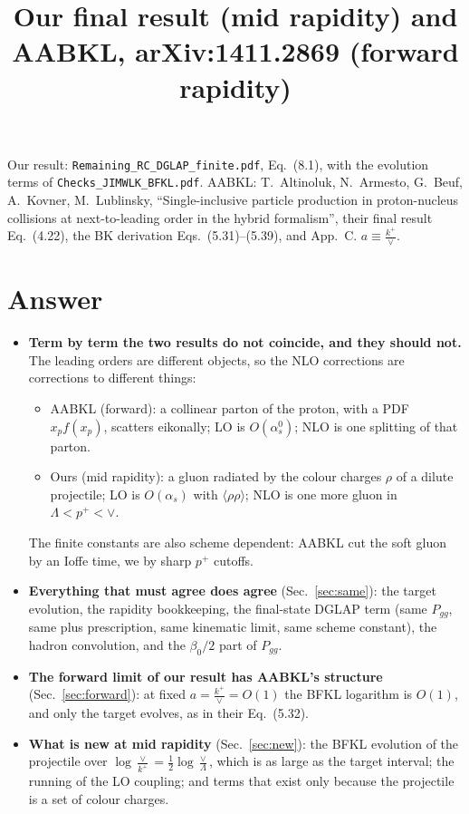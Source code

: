 \documentclass[10pt]{article}
\title{Our final result (mid rapidity) and AABKL, arXiv:1411.2869 (forward rapidity)}
\date{}
\numberwithin{equation}{section}
\begin{document}
\maketitle
\noindent Our result: \texttt{Remaining\_RC\_DGLAP\_finite.pdf}, Eq.~(8.1), with the evolution terms of \texttt{Checks\_JIMWLK\_BFKL.pdf}. AABKL: T.~Altinoluk, N.~Armesto, G.~Beuf, A.~Kovner, M.~Lublinsky, ``Single-inclusive particle production in proton-nucleus collisions at next-to-leading order in the hybrid formalism'', their final result Eq.~(4.22), the BK derivation Eqs.~(5.31)--(5.39), and App.~C. $a\equiv\frac{k^+}{\vee}$.

\section{Answer}
\begin{itemize}
\item \textbf{Term by term the two results do not coincide, and they should not.} The leading orders are different objects, so the NLO corrections are corrections to different things:
\begin{itemize}
\item AABKL (forward): a collinear parton of the proton, with a PDF $x_pf(x_p)$, scatters eikonally; LO is $O(\alpha_s^0)$; NLO is one splitting of that parton.
\item Ours (mid rapidity): a gluon radiated by the colour charges $\rho$ of a dilute projectile; LO is $O(\alpha_s)$ with $\langle\rho\rho\rangle$; NLO is one more gluon in $\Lambda<p^+<\vee$.
\end{itemize}
The finite constants are also scheme dependent: AABKL cut the soft gluon by an Ioffe time, we by sharp $p^+$ cutoffs.
\item \textbf{Everything that must agree does agree} (Sec.~\ref{sec:same}): the target evolution, the rapidity bookkeeping, the final-state DGLAP term (same $P_{gg}$, same plus prescription, same kinematic limit, same scheme constant), the hadron convolution, and the $\beta_0/2$ part of $P_{gg}$.
\item \textbf{The forward limit of our result has AABKL's structure} (Sec.~\ref{sec:forward}): at fixed $a=\frac{k^+}{\vee}=O(1)$ the BFKL logarithm is $O(1)$, and only the target evolves, as in their Eq.~(5.32).
\item \textbf{What is new at mid rapidity} (Sec.~\ref{sec:new}): the BFKL evolution of the projectile over $\log\frac{\vee}{k^+}=\frac12\log\frac{\vee}{\Lambda}$, which is as large as the target interval; the running of the LO coupling; and terms that exist only because the projectile is a set of colour charges.
\end{itemize}
\end{document}
